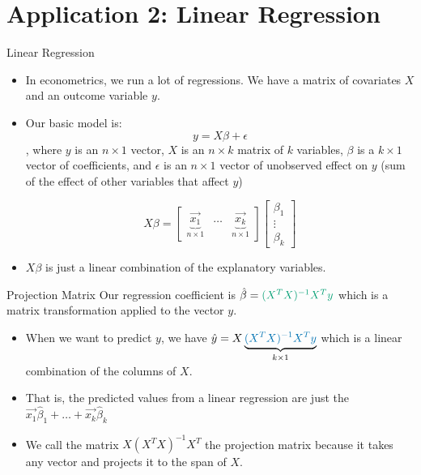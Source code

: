 \documentclass[aspectratio=43]{beamer}
\begin{document}
\section{Application 2: Linear Regression}

\begin{frame}{Linear Regression}
  \begin{itemize}
    \item In econometrics, we run a lot of regressions. We have a matrix of covariates $X$ and an outcome variable $y$.

    \item Our basic model is: $$
            y = X \beta + \epsilon
          $$, where $y$ is an $n \times 1$ vector, $X$ is an $n \times k$ matrix of $k$ variables, $\beta$ is a $k \times 1$ vector of coefficients, and $\epsilon$ is an $n \times 1$ vector of unobserved effect on $y$ (sum of the effect of other variables that affect $y$)

          $$
            X \beta = \begin{bmatrix} \underbrace{\vec{x_1}}_{n \times 1} &  \dots & \underbrace{\vec{x_k}}_{n \times 1}\end{bmatrix} \begin{bmatrix} \beta_1 \\ \vdots \\ \beta_k \end{bmatrix}
          $$
    \item $X \beta$ is just a linear combination of the explanatory variables.
  \end{itemize}
\end{frame}

\begin{frame}{Projection Matrix}
  Our regression coefficient is $\hat{\beta} = {\color{kelly} (X^T X)^{-1} X^T y}$ which is a matrix transformation applied to the vector $y$.

  \begin{itemize}
    \item When we want to predict $y$, we have $\hat{y} = X \underbrace{{\color{alice} (X^T X)^{-1} X^T y}}_{k \times 1}$ which is a linear combination of the columns of $X$.

    \item That is, the predicted values from a linear regression are just the $\vec{x_1} \hat{\beta}_1 + \dots + \vec{x_k} \hat{\beta}_k$

    \item We call the matrix $X (X^T X)^{-1} X^T$ the \alert{projection matrix} because it takes any vector and projects it to the span of $X$.
  \end{itemize}
\end{frame}
\end{document}
